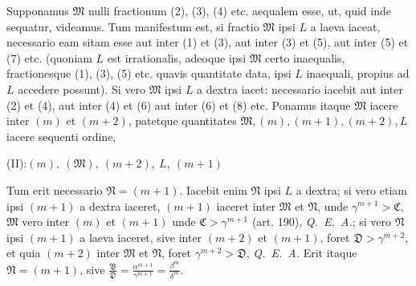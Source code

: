 Supponamus $\mathfrak{M}$ nulli fractionum (2), (3), (4) etc. aequalem esse, ut, quid inde sequatur, videamus. Tum manifestum est, si fractio $\mathfrak{M}$ ipsi $L$ a laeva iaceat, necessario eam sitam esse aut inter (1) et (3), aut inter (3) et (5), aut inter (5) et (7) etc. (quoniam $L$ est irrationalis, adeoque ipsi $\mathfrak{M}$ certo inaequalis, fractionesque (1), (3), (5) etc. quavis quantitate data, ipsi $L$ inaequali, propius ad $L$ accedere possunt). Si vero $\mathfrak{M}$ ipsi $L$ a dextra iacet: necessario iacebit aut inter (2) et (4), aut inter (4) et (6) aut inter (6) et (8) etc. Ponamus itaque $\mathfrak{M}$ iacere inter
$(m)$ et $(m+2)$, patetque quantitates $\mathfrak{M},(m),(m+1),(m+2),L$ iacere sequenti ordine,
\begin{center}
(II):\qquad $(m),\ (\mathfrak{M}),\ (m+2),\ L,\ (m+1)$
\end{center}
Tum erit necessario $\mathfrak{N}=(m+1)$. Iacebit enim $\mathfrak{N}$ ipsi $L$ a dextra; si vero etiam ipsi $(m+1)$ a dextra iaceret, $(m+1)$ iaceret inter $\mathfrak{M}$ et $\mathfrak{N}$, unde $\gamma^{m+1}>\mathfrak{C}$, $\mathfrak{M}$ vero inter $(m)$ et $(m+1)$ unde $\mathfrak{C}>\gamma^{m+1}$ (art. 190), \textit{Q. E. A.}; si vero $\mathfrak{N}$ ipsi $(m+1)$ a laeva iaceret, sive inter $(m+2)$ et $(m+1)$, foret $\mathfrak{D}>\gamma^{m+2}$, et quia $(m+2)$ inter $\mathfrak{M}$ et $\mathfrak{N}$, foret $\gamma^{m+2}>\mathfrak{D}$, \textit{Q. E. A.} Erit itaque $\mathfrak{N}=(m+1)$, sive $\frac{\mathfrak{B}}{\mathfrak{D}}=\frac{\alpha^{m+1}}{\gamma^{m+1}}=\frac{\beta^m}{\delta^m}$.

